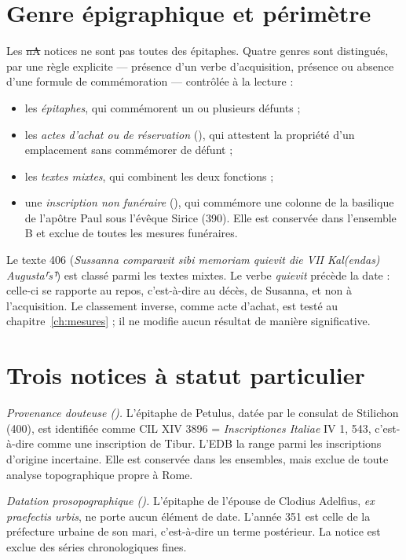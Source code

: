 \section{Genre épigraphique et périmètre}

Les \st{nA} notices ne sont pas toutes des épitaphes. Quatre genres sont distingués, par une règle explicite — présence d’un verbe d’acquisition, présence ou absence d’une formule de commémoration — contrôlée à la lecture :
\begin{itemize}
\item les \emph{épitaphes}, qui commémorent un ou plusieurs défunts ;
\item les \emph{actes d’achat ou de réservation} (), qui attestent la propriété d’un emplacement sans commémorer de défunt ;
\item les \emph{textes mixtes}, qui combinent les deux fonctions ;
\item une \emph{inscription non funéraire} (), qui commémore une colonne de la basilique de l’apôtre Paul sous l’évêque Sirice (390). Elle est conservée dans l’ensemble B et exclue de toutes les mesures funéraires.
\end{itemize}

Le texte 406 (\emph{Sussanna comparavit sibi memoriam quievit die VII Kal(endas) Augusta⸢s⸣}) est classé parmi les textes mixtes. Le verbe \emph{quievit} précède la date : celle-ci se rapporte au repos, c’est-à-dire au décès, de Susanna, et non à l’acquisition. Le classement inverse, comme acte d’achat, est testé au chapitre~\ref{ch:mesures} ; il ne modifie aucun résultat de manière significative.

\section{Trois notices à statut particulier}

\emph{Provenance douteuse ().} L’épitaphe de Petulus, datée par le consulat de Stilichon (400), est identifiée comme CIL XIV 3896 = \emph{Inscriptiones Italiae} IV 1, 543, c’est-à-dire comme une inscription de Tibur. L’EDB la range parmi les inscriptions d’origine incertaine. Elle est conservée dans les ensembles, mais exclue de toute analyse topographique propre à Rome.

\emph{Datation prosopographique ().} L’épitaphe de l’épouse de Clodius Adelfius, \emph{ex praefectis urbis}, ne porte aucun élément de date. L’année 351 est celle de la préfecture urbaine de son mari, c’est-à-dire un terme postérieur. La notice est exclue des séries chronologiques fines.

